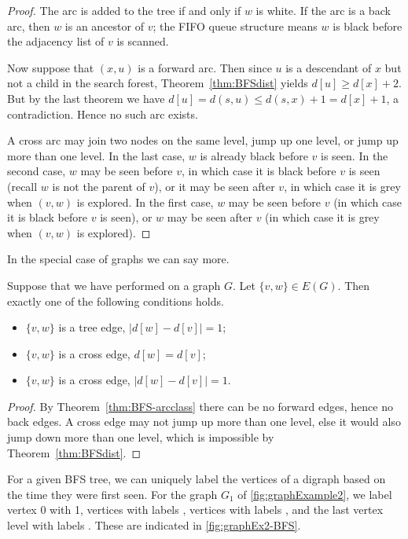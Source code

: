 \begin{proof}
The arc is added to the tree if and only if $w$ is white. If the arc is
a back arc, then $w$ is an ancestor of $v$; the FIFO queue structure
means $w$ is black before the adjacency list of $v$ is scanned. 

Now suppose that $(x, u)$ is a forward arc. Then since $u$ is a
descendant of $x$ but not a child in the search forest, 
Theorem~\ref{thm:BFSdist} yields $d[u]
\geq d[x] + 2$. But by the last theorem we have $d[u] = d(s, u) \leq
d(s, x) + 1 = d[x] + 1$, a contradiction. Hence no such arc exists.

A cross arc may join two nodes on the same level, jump up one level,
or jump up more than one level. In the last case, $w$ is already black
before $v$ is seen. In the second case, $w$ may be seen before $v$,
in which case it is black before $v$ is seen (recall $w$ is not the
parent of $v$), or it may be seen after $v$, in which case it is grey
when $(v, w)$ is explored. In the first case, $w$ may be seen before $v$ (in
which case it is black before $v$ is seen), or $w$ may be seen after $v$
(in which case it is grey when $(v, w)$ is explored).
\end{proof}

In the special case of graphs we can say more.

\begin{Theorem}
\label{thm:BFS-grapharcclass}
Suppose that we have performed  on a graph $G$. Let $\{v,
w\}\in E(G)$. Then exactly one of the following conditions holds.

\begin{itemize}
\item
$\{v, w\}$ is a tree edge, $| d[w] - d[v] |= 1$;
\item
$\{v, w\}$ is a cross edge, $d[w] = d[v]$;
\item
$\{v, w\}$ is a cross edge, $| d[w] - d[v] | = 1$.
\end{itemize}
\end{Theorem}

\begin{proof} By Theorem~\ref{thm:BFS-arcclass} there can be no forward
edges, hence no back edges. A cross edge may not jump up more than
one level, else it would also jump down more than one level, which is
impossible by Theorem~\ref{thm:BFSdist}.
\end{proof}

For a given BFS tree, we can uniquely label the vertices of
a digraph based on the time they were first seen. For the graph
$G_1$ of \cref{fig:graphExample2}, we label vertex 0 with 1,
vertices  with labels , vertices  with
labels , and the last vertex level  with labels
. These are indicated in \cref{fig:graphEx2-BFS}.

